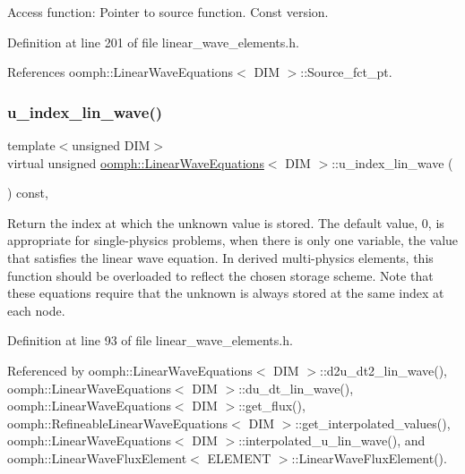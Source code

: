 Access function\+: Pointer to source function. Const version. 



Definition at line 201 of file linear\+\_\+wave\+\_\+elements.\+h.



References oomph\+::\+Linear\+Wave\+Equations$<$ D\+I\+M $>$\+::\+Source\+\_\+fct\+\_\+pt.

\mbox{\label{classoomph_1_1LinearWaveEquations_aba49f677e10850fc49d76a982522ce69}} 
\subsubsection{\texorpdfstring{u\+\_\+index\+\_\+lin\+\_\+wave()}{u\_index\_lin\_wave()}}
{\footnotesize\ttfamily template$<$unsigned D\+IM$>$ \\
virtual unsigned \hyperlink{classoomph_1_1LinearWaveEquations}{oomph\+::\+Linear\+Wave\+Equations}$<$ D\+IM $>$\+::u\+\_\+index\+\_\+lin\+\_\+wave (\begin{DoxyParamCaption}{ }\end{DoxyParamCaption}) const\hspace{0.3cm}{\ttfamily [inline]}, {\ttfamily [virtual]}}



Return the index at which the unknown value is stored. The default value, 0, is appropriate for single-\/physics problems, when there is only one variable, the value that satisfies the linear wave equation. In derived multi-\/physics elements, this function should be overloaded to reflect the chosen storage scheme. Note that these equations require that the unknown is always stored at the same index at each node. 



Definition at line 93 of file linear\+\_\+wave\+\_\+elements.\+h.



Referenced by oomph\+::\+Linear\+Wave\+Equations$<$ D\+I\+M $>$\+::d2u\+\_\+dt2\+\_\+lin\+\_\+wave(), oomph\+::\+Linear\+Wave\+Equations$<$ D\+I\+M $>$\+::du\+\_\+dt\+\_\+lin\+\_\+wave(), oomph\+::\+Linear\+Wave\+Equations$<$ D\+I\+M $>$\+::get\+\_\+flux(), oomph\+::\+Refineable\+Linear\+Wave\+Equations$<$ D\+I\+M $>$\+::get\+\_\+interpolated\+\_\+values(), oomph\+::\+Linear\+Wave\+Equations$<$ D\+I\+M $>$\+::interpolated\+\_\+u\+\_\+lin\+\_\+wave(), and oomph\+::\+Linear\+Wave\+Flux\+Element$<$ E\+L\+E\+M\+E\+N\+T $>$\+::\+Linear\+Wave\+Flux\+Element().



